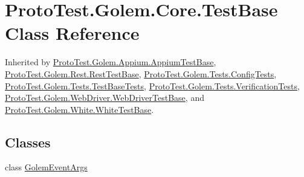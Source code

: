 \hypertarget{class_proto_test_1_1_golem_1_1_core_1_1_test_base}{\section{Proto\-Test.\-Golem.\-Core.\-Test\-Base Class Reference}
\label{class_proto_test_1_1_golem_1_1_core_1_1_test_base}
}


Inherited by \hyperlink{class_proto_test_1_1_golem_1_1_appium_1_1_appium_test_base}{Proto\-Test.\-Golem.\-Appium.\-Appium\-Test\-Base}, \hyperlink{class_proto_test_1_1_golem_1_1_rest_1_1_rest_test_base}{Proto\-Test.\-Golem.\-Rest.\-Rest\-Test\-Base}, \hyperlink{class_proto_test_1_1_golem_1_1_tests_1_1_config_tests}{Proto\-Test.\-Golem.\-Tests.\-Config\-Tests}, \hyperlink{class_proto_test_1_1_golem_1_1_tests_1_1_test_base_tests}{Proto\-Test.\-Golem.\-Tests.\-Test\-Base\-Tests}, \hyperlink{class_proto_test_1_1_golem_1_1_tests_1_1_verification_tests}{Proto\-Test.\-Golem.\-Tests.\-Verification\-Tests}, \hyperlink{class_proto_test_1_1_golem_1_1_web_driver_1_1_web_driver_test_base}{Proto\-Test.\-Golem.\-Web\-Driver.\-Web\-Driver\-Test\-Base}, and \hyperlink{class_proto_test_1_1_golem_1_1_white_1_1_white_test_base}{Proto\-Test.\-Golem.\-White.\-White\-Test\-Base}.

\subsection*{Classes}
\begin{DoxyCompactItemize}
\item 
class \hyperlink{class_proto_test_1_1_golem_1_1_core_1_1_test_base_1_1_golem_event_args}{Golem\-Event\-Args}
\end{DoxyCompactItemize}
